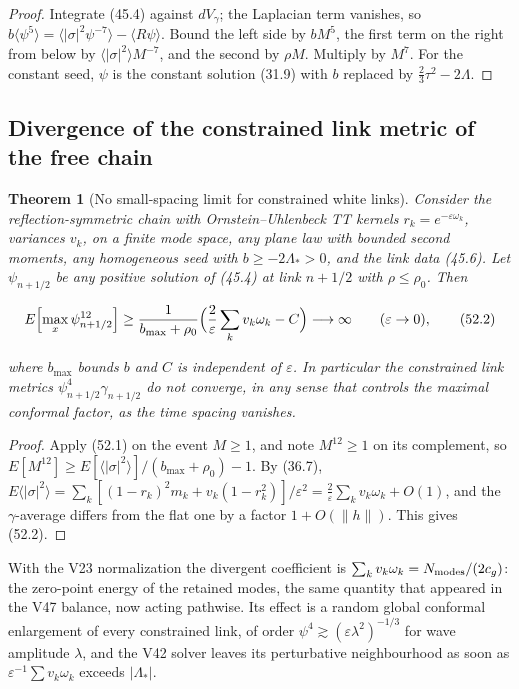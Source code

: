 \documentclass[11pt]{article}
\newtheorem{theorem}{Theorem}[section]
\theoremstyle{remark}
\begin{document}
\begin{proof}
Integrate (45.4) against \(dV_\gamma\); the Laplacian term vanishes,
so \(b\langle\psi^5\rangle=\langle|\sigma|^2\psi^{-7}\rangle-\langle R\psi\rangle\).
Bound the left side by \(bM^5\), the first term on the right from below
by \(\langle|\sigma|^2\rangle M^{-7}\), and the second by \(\rho M\).
Multiply by \(M^7\).  For the constant seed, \(\psi\) is the constant
solution (31.9) with \(b\) replaced by \(\tfrac23\tau^2-2\Lambda\).
\end{proof}

\subsection{Divergence of the constrained link metric of the free chain}

\begin{theorem}[No small-spacing limit for constrained white links]
\label{thm:v19v49-divergence}
Consider the reflection-symmetric chain with Ornstein--Uhlenbeck TT
kernels \(r_k=e^{-\varepsilon\omega_k}\), variances \(v_k\), on a
finite mode space, any plane law with bounded second moments, any
homogeneous seed with \(b\geq-2\Lambda_*>0\), and the link data (45.6).
Let \(\psi_{n+1/2}\) be any positive solution of (45.4) at link
\(n+1/2\) with \(\rho\leq\rho_0\).  Then

\[
 E\Bigl[\max_x\psi_{n+1/2}^{12}\Bigr]
 \geq\frac{1}{b_{\max}+\rho_0}\Bigl(\frac2\varepsilon\sum_kv_k\omega_k-C\Bigr)
 \longrightarrow\infty\qquad(\varepsilon\to0),                          \tag{52.2}
\]

where \(b_{\max}\) bounds \(b\) and \(C\) is independent of
\(\varepsilon\).  In particular the constrained link metrics
\(\psi_{n+1/2}^4\gamma_{n+1/2}\) do not converge, in any sense that
controls the maximal conformal factor, as the time spacing vanishes.
\end{theorem}

\begin{proof}
Apply (52.1) on the event \(M\geq1\), and note \(M^{12}\geq1\) on its
complement, so
\(E[M^{12}]\geq E[\langle|\sigma|^2\rangle]/(b_{\max}+\rho_0)-1\).  By
(36.7), \(E\langle|\sigma|^2\rangle=\sum_k[(1-r_k)^2m_k+v_k(1-r_k^2)]/\varepsilon^2
=\tfrac2\varepsilon\sum_kv_k\omega_k+O(1)\), and the \(\gamma\)-average
differs from the flat one by a factor \(1+O(\|h\|)\).  This gives
(52.2).
\end{proof}

With the V23 normalization the divergent coefficient is
\(\sum_kv_k\omega_k=N_{\rm modes}/(2c_g)\): the zero-point energy of the
retained modes, the same quantity that appeared in the V47 balance,
now acting pathwise.  Its effect is a random global conformal
enlargement of every constrained link, of order
\(\psi^4\gtrsim(\varepsilon\lambda^2)^{-1/3}\) for wave amplitude
\(\lambda\), and the V42 solver leaves its perturbative neighbourhood
as soon as \(\varepsilon^{-1}\sum v_k\omega_k\) exceeds \(|\Lambda_*|\).
\end{document}
